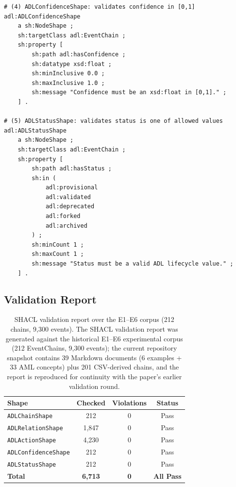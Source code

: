 \begin{lstlisting}[language=turtle, caption={SHACL shape graph for ADL Lite validation.}, label={lst:shacl-shapes}]
# (4) ADLConfidenceShape: validates confidence in [0,1]
adl:ADLConfidenceShape
    a sh:NodeShape ;
    sh:targetClass adl:EventChain ;
    sh:property [
        sh:path adl:hasConfidence ;
        sh:datatype xsd:float ;
        sh:minInclusive 0.0 ;
        sh:maxInclusive 1.0 ;
        sh:message "Confidence must be an xsd:float in [0,1]." ;
    ] .

# (5) ADLStatusShape: validates status is one of allowed values
adl:ADLStatusShape
    a sh:NodeShape ;
    sh:targetClass adl:EventChain ;
    sh:property [
        sh:path adl:hasStatus ;
        sh:in (
            adl:provisional
            adl:validated
            adl:deprecated
            adl:forked
            adl:archived
        ) ;
        sh:minCount 1 ;
        sh:maxCount 1 ;
        sh:message "Status must be a valid ADL lifecycle value." ;
    ] .
\end{lstlisting}

\subsection{Validation Report}

\begin{table}[htbp]
\centering
\caption{SHACL validation report over the E1--E6 corpus (212 chains, 9,300 events). The SHACL validation report was generated against the historical E1--E6 experimental corpus (212 EventChains, 9,300 events); the current repository snapshot contains 39 Markdown documents (6 examples + 33 AML concepts) plus 201 CSV-derived chains, and the report is reproduced for continuity with the paper's earlier validation round.}
\label{tab:shacl-validation-report}
\begin{tabular}{@{}lccc@{}}
\toprule
\textbf{Shape} & \textbf{Checked} & \textbf{Violations} & \textbf{Status} \\
\midrule
\texttt{ADLChainShape} & 212 & 0 & Pass \\
\texttt{ADLRelationShape} & 1,847 & 0 & Pass \\
\texttt{ADLActionShape} & 4,230 & 0 & Pass \\
\texttt{ADLConfidenceShape} & 212 & 0 & Pass \\
\texttt{ADLStatusShape} & 212 & 0 & Pass \\
\midrule
\textbf{Total} & \textbf{6,713} & \textbf{0} & \textbf{All Pass} \\
\bottomrule
\end{tabular}
\end{table}

